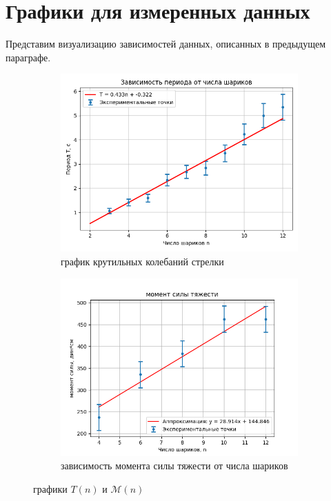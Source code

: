 \documentclass[a4paper, 10pt]{article}
\begin{document}
\section*{Графики для измеренных данных}
Представим визуализацию зависимостей данных, описанных в предыдущем параграфе.
\begin{figure}[htbp]
    \centering
    \begin{subfigure}{0.45\textwidth}
        \includegraphics[width=\linewidth]{period.png}
        \caption{график крутильных колебаний стрелки}
        \label{горизонтальная составляющая}
    \end{subfigure}
    \begin{subfigure}{0.45\textwidth}
        \includegraphics[width=\linewidth]{vertical.png}
        \caption{зависимость момента силы тяжести от числа шариков}
        \label{вертикальная составляющая}
    \end{subfigure}
    \caption{графики $T(n)$ и $\mathcal{M}(n)$}
    \label{графики моментов и периодов}
\end{figure}
\end{document}
